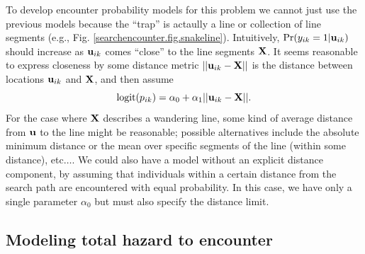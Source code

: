 To develop encounter probability models for this problem we cannot
just use the previous models because the ``trap'' is actaully a line
or collection of line segments (e.g.,
Fig. \ref{searchencounter.fig.snakeline}).  Intuitively,
$\Pr(y_{ik}=1|{\bf u}_{ik})$ should increase as ${\bf u}_{ik}$ comes
``close'' to the line segments ${\bf X}$. It seems reasonable to
express closeness by some distance metric $||{\bf u}_{ik} - {\bf X}
||$ is the distance between locations ${\bf u}_{ik}$ and ${\bf X}$,
and then assume
\[
\mbox{logit}(p_{ik}) = \alpha_{0} + \alpha_{1} ||{\bf u}_{ik} - {\bf X}||.
\]
For the case where ${\bf X}$ describes a wandering line, some
kind of average distance from ${\bf u}$ to the line
might be reasonable; possible alternatives include the absolute
minimum distance or the mean over specific segments
of the line (within some distance), etc$\dots$.  We could also have a model
without an explicit distance component, by assuming that individuals
within a certain distance from the search path are encountered with
equal probability. In this case, we have only a single parameter
$\alpha_{0}$ but must also specify the distance limit.


\subsection{Modeling total hazard to encounter}

